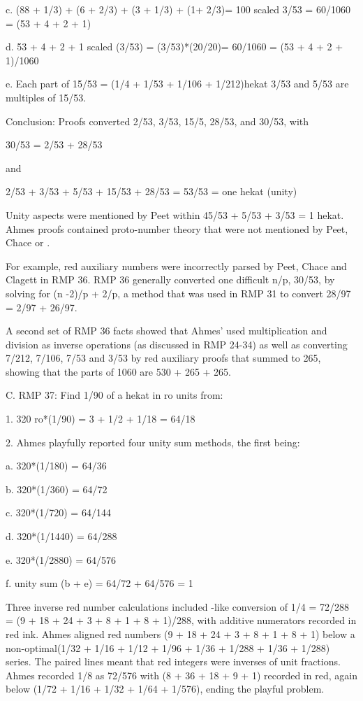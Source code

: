 \documentclass[12pt]{article}
\begin{document}
c. (88 + 1/3) + (6 + 2/3) + (3 + 1/3) + (1+ 2/3)= 100 scaled 3/53 = 60/1060 = (53 + 4 + 2 + 1)

d. 53 + 4 + 2 + 1 scaled (3/53) = (3/53)*(20/20)= 60/1060 = (53 + 4 + 2 + 1)/1060

e. Each part of 15/53 = (1/4 + 1/53 + 1/106 + 1/212)hekat  3/53 and 5/53 are multiples of 15/53.

Conclusion: Proofs converted 2/53, 3/53, 15/5, 28/53, and 30/53, with 

30/53 = 2/53 + 28/53 

and 

2/53 + 3/53 + 5/53 + 15/53 + 28/53 = 53/53 = one hekat (unity)

Unity aspects were mentioned by Peet within 45/53 + 5/53 + 3/53 = 1 hekat. Ahmes proofs contained proto-number theory that were not mentioned by Peet, Chace or . 

For example, red auxiliary numbers were incorrectly parsed by Peet, Chace and Clagett in RMP 36. RMP 36 generally converted one difficult n/p, 30/53, by solving for (n -2)/p + 2/p, a method that was used in RMP 31  to convert 28/97 = 2/97 + 26/97. 

A second set of RMP 36 facts showed that Ahmes' used multiplication and division as inverse operations (as discussed in RMP 24-34) as well as converting 7/212, 7/106, 7/53 and 3/53 by red auxiliary proofs that summed to 265, showing that the parts of 1060 are 530 + 265 + 265.
 
C. RMP 37: Find 1/90 of a hekat in ro units from:

1. 320 ro*(1/90) = 3 + 1/2 + 1/18 = 64/18

2. Ahmes playfully reported four unity sum methods, the first being:

a. 320*(1/180) = 64/36

b. 320*(1/360) = 64/72

c. 320*(1/720) = 64/144

d. 320*(1/1440) = 64/288

e. 320*(1/2880) = 64/576

f. unity sum (b + e) = 64/72 + 64/576 = 1

Three inverse red number calculations included -like conversion of 1/4 = 72/288 = (9 + 18 + 24 + 3 + 8 + 1 + 8 + 1)/288, with additive numerators recorded in red ink. Ahmes aligned red numbers (9 + 18 + 24 + 3 + 8 + 1 + 8 + 1) below a non-optimal(1/32 + 1/16 + 1/12 + 1/96 + 1/36 + 1/288 + 1/36 + 1/288) series. The paired lines meant that red integers were inverses of unit fractions. Ahmes recorded 1/8 as 72/576 with (8 + 36 + 18 + 9 + 1) recorded in red, again below (1/72 + 1/16 + 1/32 + 1/64 + 1/576), ending the playful problem.
\end{document}
